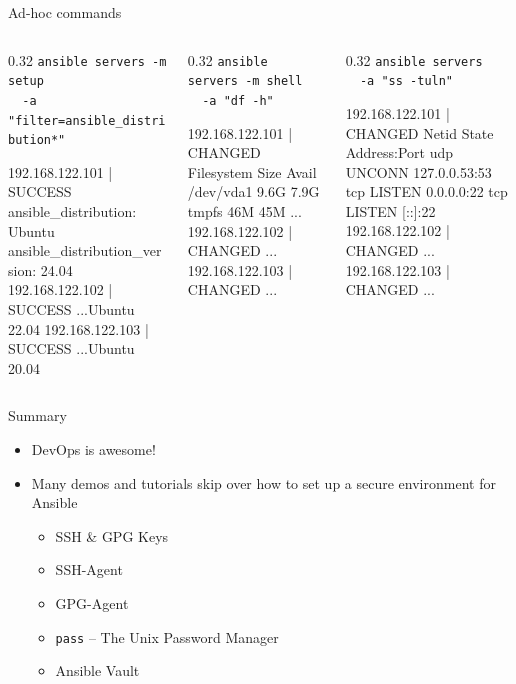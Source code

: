 \documentclass[aspectratio=169,12pt]{beamer}
\begin{document}
\begin{frame}[fragile]{Ad-hoc commands}
\begin{columns}[T]
\begin{column}{0.32\textwidth}
{\tiny\texttt{ansible servers -m setup}}\\
{\tiny\texttt{\ \ -a "filter=ansible\_distribution*"}}
\vspace{0.1cm}
\begin{termsmall}
192.168.122.101 | SUCCESS
  ansible_distribution:
    Ubuntu
  ansible_distribution_version:
    24.04
192.168.122.102 | SUCCESS
  ...Ubuntu 22.04
192.168.122.103 | SUCCESS
  ...Ubuntu 20.04
\end{termsmall}
\end{column}
\begin{column}{0.32\textwidth}
{\tiny\texttt{ansible servers -m shell}}\\
{\tiny\texttt{\ \ -a "df -h"}}
\vspace{0.1cm}
\begin{termsmall}
192.168.122.101 | CHANGED
Filesystem  Size Avail
/dev/vda1   9.6G  7.9G
tmpfs        46M   45M
...
192.168.122.102 | CHANGED
...
192.168.122.103 | CHANGED
...
\end{termsmall}
\end{column}
\begin{column}{0.32\textwidth}
{\tiny\texttt{ansible servers}}\\
{\tiny\texttt{\ \ -a "ss -tuln"}}
\vspace{0.1cm}
\begin{termsmall}
192.168.122.101 | CHANGED
Netid State
  Address:Port
udp UNCONN
  127.0.0.53:53
tcp LISTEN
  0.0.0.0:22
tcp LISTEN
  [::]:22
192.168.122.102 | CHANGED
...
192.168.122.103 | CHANGED
...
\end{termsmall}
\end{column}
\end{columns}
\end{frame}

\begin{frame}{Summary}
\begin{itemize}
  \item DevOps is awesome!
  \item Many demos and tutorials skip over how to set up a secure environment for Ansible
  \begin{itemize}
    \item SSH \& GPG Keys
    \item SSH-Agent
    \item GPG-Agent
    \item \texttt{pass} -- The Unix Password Manager
    \item Ansible Vault
  \end{itemize}
\end{itemize}
\end{frame}
\end{document}
